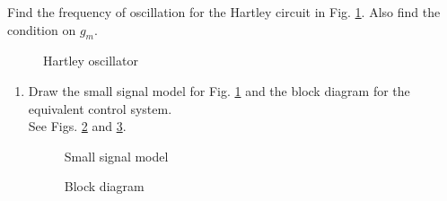 Find the frequency of oscillation for the Hartley circuit in Fig. \ref{fig:ee18btech11019_fig1}.  Also find the condition on $g_m$.
\begin{figure}[!ht]
	\begin{center}
		\resizebox{\columnwidth}{!}{}
	\end{center}
\caption{Hartley oscillator}
\label{fig:ee18btech11019_fig1}
\end{figure}
\begin{enumerate}[label=\arabic*.,ref=\theenumi]
\item Draw the small signal model for Fig. \ref{fig:ee18btech11019_fig1} and the block diagram for the equivalent control system.
\\
\solution See Figs. \ref{fig:ee18btech11019_fig2} and \ref{fig:ee18btech11019_fig3}.
%
\renewcommand{\thefigure}{\theenumi.\arabic{figure}}
\begin{figure}[!ht]
	\begin{center}
		\resizebox{\columnwidth}{!}{}
	\end{center}
\caption{Small signal model}
\label{fig:ee18btech11019_fig2}
\end{figure}

\begin{figure}[!ht]
	\begin{center}
		\resizebox{\columnwidth}{!}{}
	\end{center}
\caption{Block diagram}
\label{fig:ee18btech11019_fig3}
\end{figure}
\renewcommand{\thefigure}{\theenumi}


\end{enumerate}
